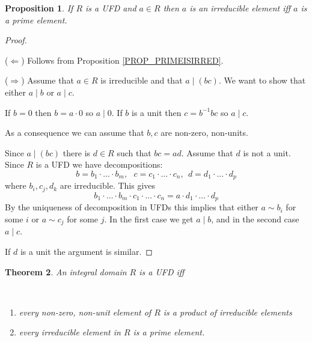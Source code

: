 \documentclass[12pt, letterpaper, oneside]{article}
\theoremstyle{plain}
\newtheorem{theorem}{Theorem}[section]
\newtheorem{proposition}[theorem]{Proposition}
\theoremstyle{definition}
\newcommand{\benu}{\begin{enumerate}}
\newcommand{\eenu}{\end{enumerate}}
\newcommand{\vs}{\vskip 5mm}
\newcommand{\isep}[1][0]{\setlength{\itemsep}{#1 mm}}
\begin{document}
\vs\vs


\begin{proposition}
\label{PROP_IRREDISPRIMEINUFD}
If $R$ is a UFD and  $a\in R$  then $a$ is an irreducible element iff  $a$ is a prime element. 
\end{proposition}

\vs


\begin{proof} \ 

($\Leftarrow$) Follows from Proposition \ref{PROP_PRIMEISIRRED}.

($\Rightarrow$) Assume that $a\in R$ is irreducible and that $a\mid (bc)$. We want 
to show that either $a\mid b$ or $a\mid c$.

If $b=0$ then $b= a\cdot 0$ so $a\mid 0$. If $b$ is a unit then $c = b^{-1}bc$ so $a\mid c$. 

As a consequence we can assume that $b, c$ are non-zero, non-units. 

Since $a\mid (bc)$ there is $d\in R$ such that $bc =ad$. Assume that $d$ is not a unit. 
Since $R$ is a UFD we have decompositions:
$$b = b_{1}\cdot {\dots} \cdot b_{m}, \ \ \ c = c_{1}\cdot {\dots} \cdot c_{n}, \ \ 
d =  d_{1}\cdot {\dots} \cdot d_{p}$$
where $b_{i}, c_{j}, d_{k}$ are irreducible.
This gives
$$b_{1}\cdot \dots {\cdot} b_{m}\cdot  c_{1}\cdot \dots {\cdot} c_{n} = a\cdot  d_{1}\cdot \dots {\cdot} d_{p}$$
By the uniqueness of decomposition in UFDs this implies that  either $a\sim b_{i}$ for some $i$
or $a\sim c_{j}$ for some $j$. In the first case we get $a\mid b$, and in the second case $a\mid c$.

If $d$ is a unit the argument is similar. 
\end{proof}

\vs\vs

\begin{theorem}
\label{THM_EQUIVUFDCONDS}
An integral domain $R$ is a UFD iff

\vskip -13mm

\ 
\benu
\isep[0]
\item every non-zero, non-unit element of $R$ is a product of irreducible elements
\item every irreducible element in $R$ is a prime element. 
\eenu
\end{theorem}

\vs
\end{document}
